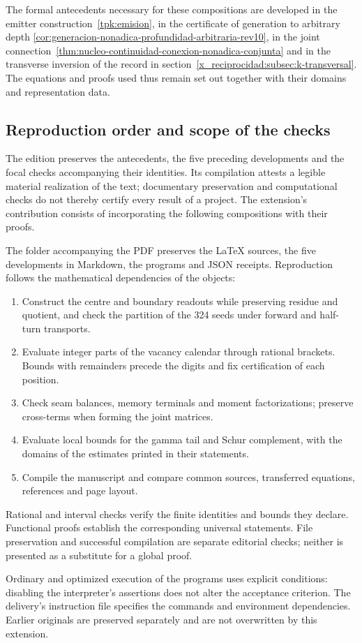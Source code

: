 The formal antecedents necessary for these compositions are
developed in the emitter construction~\ref{tpk:emision}, in the
certificate of generation to arbitrary depth
\ref{cor:generacion-nonadica-profundidad-arbitraria-rev10}, in the joint
connection~\ref{thm:nucleo-continuidad-conexion-nonadica-conjunta} and in the
transverse inversion of the record in
section~\ref{x_reciprocidad:subsec:k-transversal}. The equations and proofs
used thus remain set out together with their domains and representation
data.

\clearpage
\subsection{Reproduction order and scope of the checks}

The edition preserves the antecedents, the five preceding developments and
the focal checks accompanying their identities. Its compilation attests
a legible material realization of the text; documentary preservation and
computational checks do not thereby certify every result
of a project. The extension's contribution consists of
incorporating the following compositions with their proofs.

The folder accompanying the PDF preserves the \LaTeX{} sources, the five
developments in Markdown, the programs and JSON receipts. Reproduction
follows the mathematical dependencies of the objects:

\begin{enumerate}
\item Construct the centre and boundary readouts while preserving residue and
quotient, and check the partition of the 324 seeds under forward and
half-turn transports.
\item Evaluate integer parts of the vacancy calendar through
rational brackets. Bounds with remainders precede the digits and fix
certification of each position.
\item Check seam balances, memory terminals and
moment factorizations; preserve cross-terms when forming
the joint matrices.
\item Evaluate local bounds for the gamma tail and Schur complement,
with the domains of the estimates printed in their statements.
\item Compile the manuscript and compare common sources, transferred equations,
references and page layout.
\end{enumerate}

Rational and interval checks verify the finite identities and
bounds they declare. Functional proofs establish the
corresponding universal statements. File preservation and
successful compilation are separate editorial checks;
neither is presented as a substitute for a global proof.

Ordinary and optimized execution of the programs uses explicit
conditions: disabling the interpreter's assertions does not alter the acceptance
criterion. The delivery's instruction file specifies the
commands and environment dependencies. Earlier originals are
preserved separately and are not overwritten by this extension.
\par\endgroup
